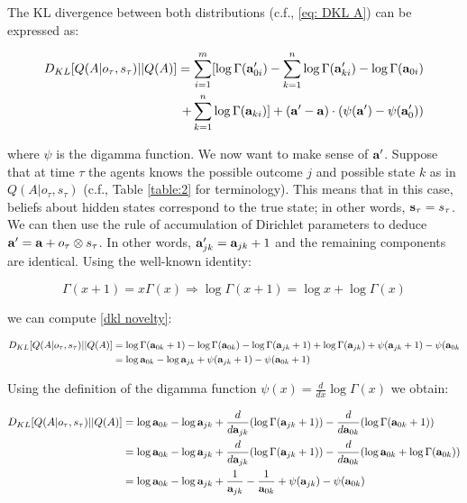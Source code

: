 \documentclass{article}
\begin{document}
The KL divergence between both distributions (c.f., \eqref{eq: DKL A}) can be expressed as:
	
	\begin{equation}
	\label{dkl novelty}
	\begin{split}
	   	D_{KL}[Q(A|o_\tau, s_\tau) || Q(A)] =\sum_{i=1}^m[\log \Gamma(\bold a '_{0 i}) -\sum_{k=1}^n\log \Gamma(\bold a '_{k i})-\log \Gamma(\bold a _{0 i})\\
		+\sum_{k=1}^n\log \Gamma(\bold a_{k i})]+(\bold a ' - \bold a)\cdot (\psi(\bold a ')-\psi(\bold a '_0)) 
	\end{split}
	\end{equation} 


where $\psi$ is the digamma function. We now want to make sense of $\bold a'$. Suppose that at time $\tau$ the agents knows the possible outcome $j$ and possible state $k$ as in $Q(A|o_\tau,s_\tau)$ (c.f., Table \ref{table:2} for terminology). This means that in this case, beliefs about hidden states correspond to the true state; in other words, $\bold s_\tau =s_\tau$. We can then use the rule of accumulation of Dirichlet parameters to deduce $\bold a'=\bold a +o_\tau \otimes s_\tau $. In other words, $\bold a'_{jk} = \bold a_{jk}+1$ and the remaining components are identical. Using the well-known identity:

\begin{equation}
	\Gamma(x+1)= x\Gamma(x)\Rightarrow \log \Gamma(x+1) = \log x + \log \Gamma(x)
\end{equation}

we can compute \eqref{dkl novelty}:

\begin{equation}
\begin{split}
	D_{KL}[Q(A|o_\tau, s_\tau) || Q(A)] &= \log \Gamma(\bold a_{0k}+1) -\log \Gamma(\bold a_{0k})-\log \Gamma (\bold a_{jk}+1)+ \log \Gamma (\bold a_{jk})+\psi(\bold a_{jk}+1)-\psi(\bold a_{0k} \\
	&=\log \bold a_{0k}-\log \bold a_{jk}+\psi (\bold a_{jk}+1)-\psi (\bold a_{0k}+1)
\end{split}
\end{equation}

Using the definition of the digamma function $\psi(x)=\frac{d}{dx} \log \Gamma(x)$ we obtain:

\begin{equation}
	\begin{split}
	D_{KL}[Q(A|o_\tau, s_\tau) || Q(A)] &= \log \bold a_{0k}-\log \bold a_{jk} +\frac{d}{d \bold a_{jk}}(\log \Gamma(\bold a_{jk}+1))- \frac{d}{d \bold a_{0k}}(\log \Gamma(\bold a _{0k}+1))\\
	&= \log \bold a_{0k}-\log \bold a_{jk} +\frac{d}{d \bold a_{jk}}(\log \Gamma(\bold a_{jk}+1))- \frac{d}{d \bold a_{0k}}(\log \bold a _{0k} +\log \Gamma(\bold a _{0k})) \\
	&= \log \bold a_{0k}-\log \bold a_{jk} + \frac{1}{\bold a_{jk}}-\frac{1}{\bold a_{0k}} +\psi(\bold a_{jk})-\psi(\bold a_{0k})
	\end{split}
\end{equation}
\end{document}
